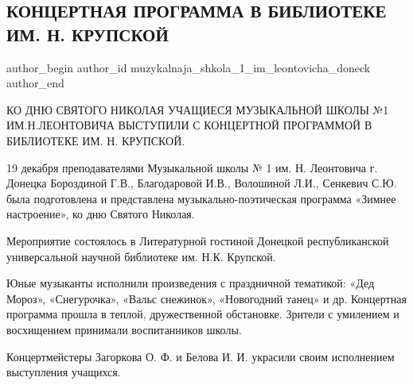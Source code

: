  
 
 
 
 
\subsection{КОНЦЕРТНАЯ ПРОГРАММА В БИБЛИОТЕКЕ ИМ. Н. КРУПСКОЙ}
\label{sec:24_12_2021.vk.muzykalnaja_shkola_1_im_leontovicha_doneck.1.koncert_biblioteka_krupskoj}

\ifcmt
 author_begin
   author_id muzykalnaja_shkola_1_im_leontovicha_doneck
 author_end
\fi

КО ДНЮ СВЯТОГО НИКОЛАЯ УЧАЩИЕСЯ МУЗЫКАЛЬНОЙ ШКОЛЫ №1 ИМ.Н.ЛЕОНТОВИЧА ВЫСТУПИЛИ
С КОНЦЕРТНОЙ ПРОГРАММОЙ В БИБЛИОТЕКЕ ИМ. Н. КРУПСКОЙ.


19 декабря преподавателями Музыкальной школы № 1 им. Н. Леонтовича г. Донецка
Бороздиной Г.В., Благодаровой И.В., Волошиной Л.И., Сенкевич С.Ю. была
подготовлена и представлена музыкально-поэтическая программа «Зимнее
настроение», ко дню Святого Николая.


Мероприятие состоялось в Литературной гостиной Донецкой республиканской
универсальной научной библиотеке им. Н.К. Крупской.

Юные музыканты исполнили произведения с праздничной тематикой: «Дед Мороз»,
«Снегурочка», «Вальс снежинок», «Новогодний танец» и др. Концертная программа
прошла в теплой, дружественной обстановке. Зрители с умилением и восхищением
принимали воспитанников школы.

Концертмейстеры Загоркова О. Ф. и Белова И. И. украсили своим исполнением
выступления учащихся.
